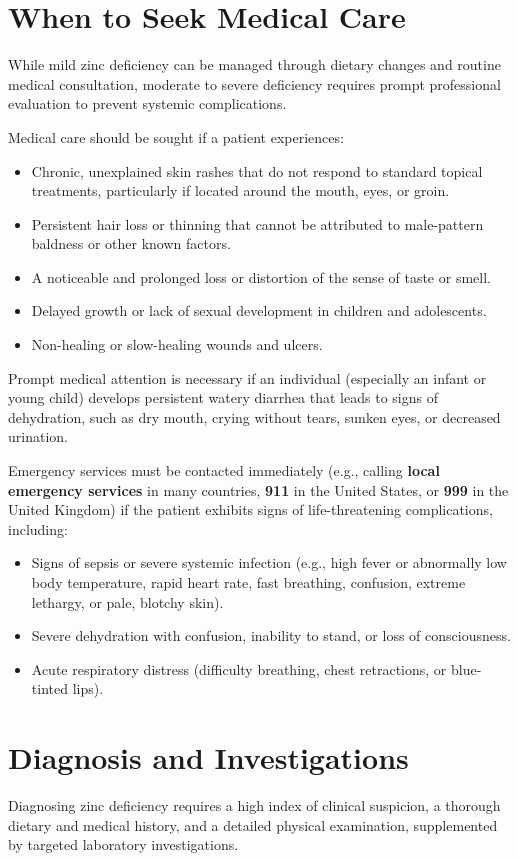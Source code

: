 \section*{When to Seek Medical Care}
While mild zinc deficiency can be managed through dietary changes and routine medical consultation, moderate to severe deficiency requires prompt professional evaluation to prevent systemic complications.

Medical care should be sought if a patient experiences:
\begin{itemize}
    \item Chronic, unexplained skin rashes that do not respond to standard topical treatments, particularly if located around the mouth, eyes, or groin.
    \item Persistent hair loss or thinning that cannot be attributed to male-pattern baldness or other known factors.
    \item A noticeable and prolonged loss or distortion of the sense of taste or smell.
    \item Delayed growth or lack of sexual development in children and adolescents.
    \item Non-healing or slow-healing wounds and ulcers.
\end{itemize}

Prompt medical attention is necessary if an individual (especially an infant or young child) develops persistent watery diarrhea that leads to signs of dehydration, such as dry mouth, crying without tears, sunken eyes, or decreased urination.

Emergency services must be contacted immediately (e.g., calling \textbf{local emergency services} in many countries, \textbf{911} in the United States, or \textbf{999} in the United Kingdom) if the patient exhibits signs of life-threatening complications, including:
\begin{itemize}
    \item Signs of sepsis or severe systemic infection (e.g., high fever or abnormally low body temperature, rapid heart rate, fast breathing, confusion, extreme lethargy, or pale, blotchy skin).
    \item Severe dehydration with confusion, inability to stand, or loss of consciousness.
    \item Acute respiratory distress (difficulty breathing, chest retractions, or blue-tinted lips).
\end{itemize}

\section*{Diagnosis and Investigations}
Diagnosing zinc deficiency requires a high index of clinical suspicion, a thorough dietary and medical history, and a detailed physical examination, supplemented by targeted laboratory investigations.

